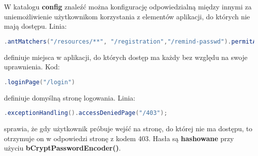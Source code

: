 \documentclass[11pt]{article}
\begin{document}
W katalogu \textbf{config} znaleźć można konfigurację odpowiedzialną między innymi za uniemożliwienie użytkownikom korzystania z elementów aplikacji, do których nie mają dostępu. \newline
Linia:
\begin{lstlisting}[language=java]
.antMatchers("/resources/**", "/registration","/remind-passwd").permitAll()
\end{lstlisting}
definiuje miejsca w aplikacji, do których dostęp ma każdy bez względu na swoje uprawnienia. \newline
Kod:
\begin{lstlisting}[language=java]
.loginPage("/login")
\end{lstlisting}
definiuje domyślną stronę logowania. \newline
Linia:
\begin{lstlisting}[language=java]
.exceptionHandling().accessDeniedPage("/403");
\end{lstlisting}
sprawia, że gdy użytkownik próbuje wejść na stronę, do której nie ma dostępu, to otrzymuje on w odpowiedzi stronę z kodem 403. \newline
Hasła są \textbf{hashowane} przy użyciu \textbf{bCryptPasswordEncoder()}.
\end{document}
